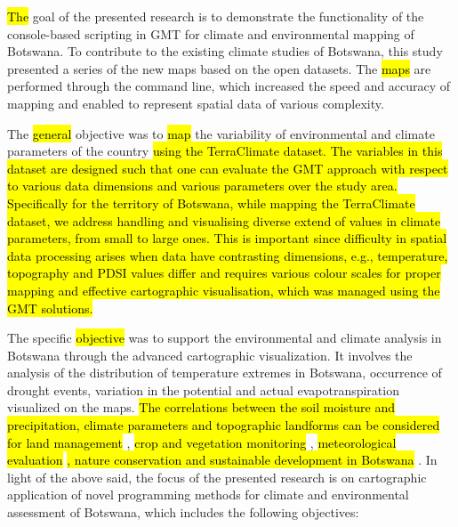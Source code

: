\documentclass[ijgi,article,submit,pdftex,moreauthors]{Definitions/mdpi}
\begin{document}
\hl{The} goal of the presented research is to demonstrate the functionality of the console-based scripting in GMT for climate and environmental mapping of Botswana. 
To contribute to the existing climate studies of Botswana, this study presented a series of the new maps based on the open datasets. The \hl{maps} are performed through the command line, which increased the speed and accuracy of mapping and enabled to represent spatial data of various complexity. 

The \hl{general} objective was to \hl{map} the variability of environmental and climate parameters of the country \hl{using the TerraClimate dataset. The variables in this dataset are designed such that one can evaluate the GMT approach with respect to various data dimensions and various parameters over the study area. Specifically for the territory of Botswana, while mapping the TerraClimate dataset, we address handling and visualising diverse extend of values in climate parameters, from small to large ones. This is important since difficulty in spatial data processing arises when data have contrasting dimensions, e.g., temperature, topography and PDSI values differ and requires various colour scales for proper mapping and effective cartographic visualisation, which was managed using the GMT solutions.}

The specific \hl{objective} was to support the environmental and climate analysis in Botswana through the advanced cartographic visualization. It involves the analysis of the distribution of temperature extremes in Botswana, occurrence of drought events, variation in the potential and actual evapotranspiration visualized on the maps. \hl{The correlations between the soil moisture and precipitation, climate parameters and topographic landforms can be considered for land management} \cite{REED2010149,Jovanovic,Basupi2017,Mfundisi}, \hl{crop and vegetation monitoring} \cite{9792979,Tsheboeng}, \hl{meteorological evaluation} \cite{Moses2019}\hl{, nature conservation and sustainable development in Botswana} \cite{Mogome,Lange}. In light of the above said, the focus of the presented research is on cartographic application of novel programming methods for climate and environmental assessment of Botswana, which includes the following objectives:
\end{document}
